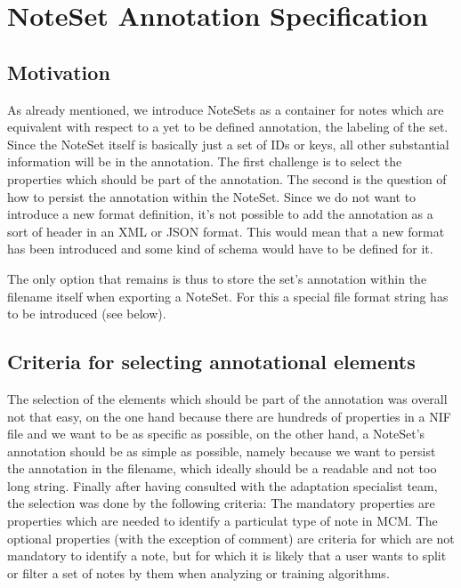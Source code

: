 \section{NoteSet Annotation Specification}
\label{ns_annotation_spec}

\subsection{Motivation}
As already mentioned, we introduce NoteSets as a container for notes which are equivalent with respect to a yet to be defined annotation, the labeling of the set. Since the NoteSet itself is basically just a set of IDs or keys, all other substantial information will be in the annotation. The first challenge is to select the properties which should be part of the annotation. The second is the question of how to persist the annotation within the NoteSet. Since we do not want to introduce a new format definition, it's not possible to add the annotation as a sort of header in an XML or JSON format. This would mean that a new format has been introduced and some kind of schema would have to be defined for it. \par
The only option that remains is thus to store the set's annotation within the filename itself when exporting a NoteSet. For this a special file format string has to be introduced (see below).
\subsection{Criteria for selecting annotational elements}
The selection of the elements which should be part of the annotation was overall not that easy, on the one hand because there are hundreds of properties in a NIF file and we want to be as specific as possible, on the other hand, a NoteSet's annotation should be as simple as possible, namely because we want to persist the annotation in the filename, which ideally should be a readable and not too long string.
Finally after having consulted with the adaptation specialist team, the selection was done by the following criteria: The mandatory properties are properties which are needed to identify a particulat type of note in MCM. The optional properties (with the exception of comment) are criteria for which are not mandatory to identify a note, but for which it is likely that a user wants to split or filter a set of notes by them when analyzing or training algorithms.
